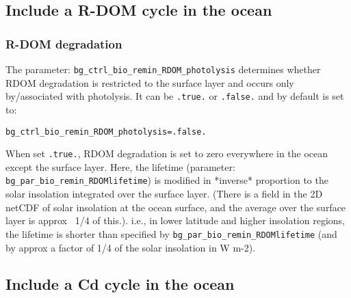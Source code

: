 \documentclass[10pt,twoside]{article}
\begin{document}

\subsection{Include a R-DOM cycle in the ocean}\label{Include a R-DOM cycle in the ocean}


\subsubsection{R-DOM degradation}\label{R-DOM degradation}

The parameter: \texttt{bg\_ctrl\_bio\_remin\_RDOM\_photolysis} determines whether RDOM degradation is restricted to the surface layer and occurs only by/associated with photolysis. It can be \texttt{.true.} or \texttt{.false.} and by default is set to:
\vspace{-10pt}\begin{verbatim}bg_ctrl_bio_remin_RDOM_photolysis=.false.\end{verbatim}\vspace{-10pt}
When set \texttt{.true.}, RDOM degradation is set to zero everywhere in the ocean except the surface layer. Here, the lifetime (parameter: \texttt{bg\_par\_bio\_remin\_RDOMlifetime}) is modified in *inverse* proportion to the solar insolation integrated over the surface layer. (There is a field in the 2D netCDF of solar insolation at the ocean surface, and the average over the surface layer is approx ~1/4 of this.). i.e., in lower latitude and higher insolation regions, the lifetime is shorter than specified by \texttt{bg\_par\_bio\_remin\_RDOMlifetime} (and by approx a factor of 1/4 of the solar insolation in W m-2).


\subsection{Include a Cd cycle in the ocean}\label{Include a Cd cycle in the ocean}
\end{document}
